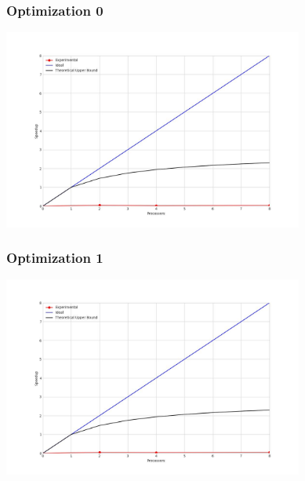 \subsubsection{Optimization 0}
\begin{center}
    \resizebox{0.8\textwidth}{!}{}
    \includegraphics[width=0.74\textwidth]{../img/speedup-graph_type-fully-disconnected-1000000-O0}
\end{center}

\subsubsection{Optimization 1}
\begin{center}
    \resizebox{0.8\textwidth}{!}{}
    \includegraphics[width=0.74\textwidth]{../img/speedup-graph_type-fully-disconnected-1000000-O1}
\end{center}

\clearpage
